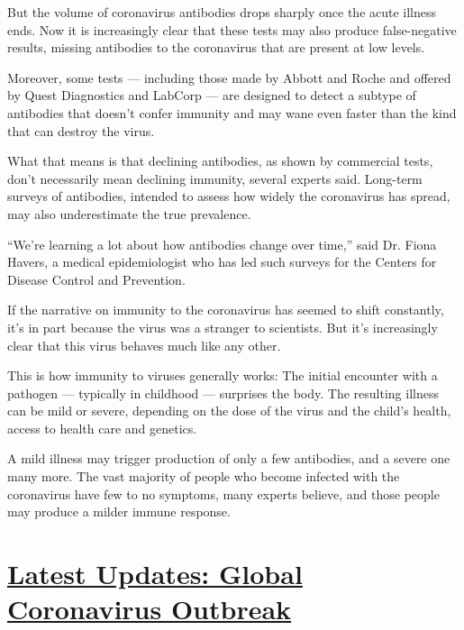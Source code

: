But the volume of coronavirus antibodies drops sharply once the acute
illness ends. Now it is increasingly clear that these tests may also
produce false-negative results, missing antibodies to the coronavirus
that are present at low levels.

Moreover, some tests --- including those made by Abbott and Roche and
offered by Quest Diagnostics and LabCorp --- are designed to detect a
subtype of antibodies that doesn't confer immunity and may wane even
faster than the kind that can destroy the virus.

What that means is that declining antibodies, as shown by commercial
tests, don't necessarily mean declining immunity, several experts said.
Long-term surveys of antibodies, intended to assess how widely the
coronavirus has spread, may also underestimate the true prevalence.

``We're learning a lot about how antibodies change over time,'' said Dr.
Fiona Havers, a medical epidemiologist who has led such surveys for the
Centers for Disease Control and Prevention.

If the narrative on immunity to the coronavirus has seemed to shift
constantly, it's in part because the virus was a stranger to scientists.
But it's increasingly clear that this virus behaves much like any other.

This is how immunity to viruses generally works: The initial encounter
with a pathogen --- typically in childhood --- surprises the body. The
resulting illness can be mild or severe, depending on the dose of the
virus and the child's health, access to health care and genetics.

A mild illness may trigger production of only a few antibodies, and a
severe one many more. The vast majority of people who become infected
with the coronavirus have few to no symptoms, many experts believe, and
those people may produce a milder immune response.

\hypertarget{latest-updates-global-coronavirus-outbreak}{%
\section{\texorpdfstring{\href{https://www.nytimes.com/2020/08/01/world/coronavirus-covid-19.html?action=click\&pgtype=Article\&state=default\&region=MAIN_CONTENT_1\&context=storylines_live_updates}{Latest
Updates: Global Coronavirus
Outbreak}}{Latest Updates: Global Coronavirus Outbreak}}\label{latest-updates-global-coronavirus-outbreak}}

